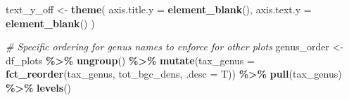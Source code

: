 \documentclass[
]{article}
\newenvironment{Shaded}{\begin{snugshade}}{\end{snugshade}}
\newcommand{\AttributeTok}[1]{\textcolor[rgb]{0.13,0.29,0.53}{#1}}
\newcommand{\CommentTok}[1]{\textcolor[rgb]{0.56,0.35,0.01}{\textit{#1}}}
\newcommand{\FunctionTok}[1]{\textcolor[rgb]{0.13,0.29,0.53}{\textbf{#1}}}
\newcommand{\NormalTok}[1]{#1}
\newcommand{\OtherTok}[1]{\textcolor[rgb]{0.56,0.35,0.01}{#1}}
\newcommand{\SpecialCharTok}[1]{\textcolor[rgb]{0.81,0.36,0.00}{\textbf{#1}}}
\begin{document}
\begin{Shaded}
\begin{Highlighting}[]
\NormalTok{text\_y\_off }\OtherTok{\textless{}{-}} \FunctionTok{theme}\NormalTok{(}
  \AttributeTok{axis.title.y =} \FunctionTok{element\_blank}\NormalTok{(),}
  \AttributeTok{axis.text.y =} \FunctionTok{element\_blank}\NormalTok{()}
\NormalTok{)}

\CommentTok{\# Specific ordering for genus names to enforce for other plots}
\NormalTok{genus\_order }\OtherTok{\textless{}{-}}\NormalTok{ df\_plots }\SpecialCharTok{\%\textgreater{}\%}
  \FunctionTok{ungroup}\NormalTok{() }\SpecialCharTok{\%\textgreater{}\%}
  \FunctionTok{mutate}\NormalTok{(}\AttributeTok{tax\_genus =} \FunctionTok{fct\_reorder}\NormalTok{(tax\_genus, tot\_bgc\_dens, }\AttributeTok{.desc =}\NormalTok{ T)) }\SpecialCharTok{\%\textgreater{}\%}
  \FunctionTok{pull}\NormalTok{(tax\_genus) }\SpecialCharTok{\%\textgreater{}\%}
  \FunctionTok{levels}\NormalTok{()}


\end{Highlighting}
\end{Shaded}
\end{document}
